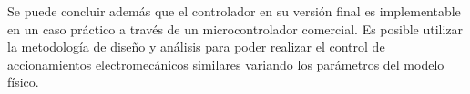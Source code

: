 \documentclass[a4paper, 10pt, onecolumn,journal]{ieeeconf}
\begin{document}
Se puede concluir además que el controlador en su versión final es implementable 
en un caso práctico a través de un microcontrolador comercial. Es posible utilizar
la metodología de diseño y análisis para poder realizar el control de accionamientos electromecánicos
similares variando los parámetros del modelo físico.




%
\nocite{*}
\printbibliography
\end{document}
